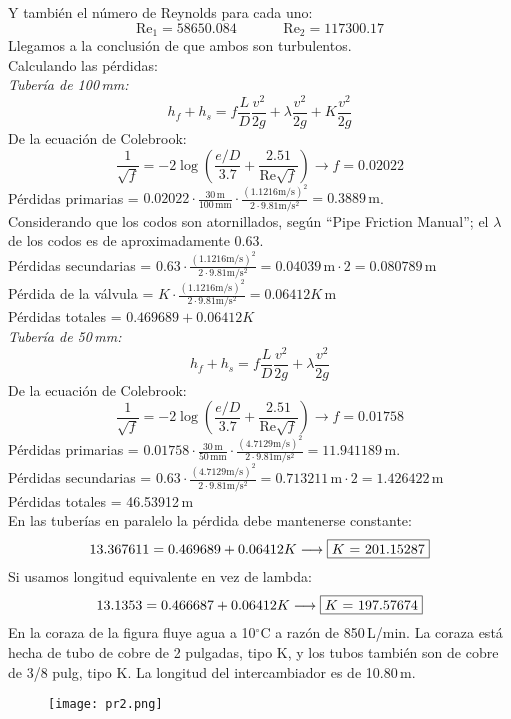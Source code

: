 \documentclass[a4paper,12pt]{exam}
\begin{document}
\begin{questions}
$$$$
Y también el número de Reynolds para cada uno:
$$
\mathrm{Re_{1}} = 58650.084 \hspace{40pt} \mathrm{Re_{2}} = 117300.17
$$
Llegamos a la conclusión de que ambos son turbulentos.\\
Calculando las pérdidas:\\
\textit{Tubería de 100\,mm:}\\
$$
h_{f}+h_{s} = f\frac{L}{D} \frac{v^{2}}{2g} + \lambda \frac{v^{2}}{2g} + K\frac{v^{2}}{2g}
$$
De la ecuación de Colebrook:
$$
\frac{1}{\sqrt{f}} = -2\log \left(\frac{e/D}{3.7} + \frac{2.51}{\mathrm{Re}\sqrt{f}}\right) \longrightarrow f = 0.02022
$$
Pérdidas primarias = $0.02022\cdot\frac{30\,\mathrm{m}}{100\,\mathrm{mm}}\cdot \frac{(1.1216\mathrm{m/s})^{2}}{2\cdot 9.81\mathrm{m/s^{2}}} = 0.3889\,\mathrm{m}$.\\
Considerando que los codos son atornillados, según ``Pipe Friction Manual''; el $\lambda$ de los codos es de aproximadamente 0.63.\\[4pt]
Pérdidas secundarias = $0.63\cdot \frac{(1.1216\mathrm{m/s})^{2}}{2\cdot 9.81\mathrm{m/s^{2}}} = 0.04039\,\mathrm{m} \cdot 2 = 0.080789\,\mathrm{m}$\\[4pt]
Pérdida de la válvula = $K\cdot \frac{(1.1216\mathrm{m/s})^{2}}{2\cdot 9.81\mathrm{m/s^{2}}} = 0.06412 K\,\mathrm{m}$\\[4pt]
Pérdidas totales = $0.469689 + 0.06412K$\\[5pt]
\textit{Tubería de 50\,mm:}\\
$$
h_{f}+h_{s} = f\frac{L}{D} \frac{v^{2}}{2g} + \lambda \frac{v^{2}}{2g}
$$
De la ecuación de Colebrook:
$$
\frac{1}{\sqrt{f}} = -2\log \left(\frac{e/D}{3.7} + \frac{2.51}{\mathrm{Re}\sqrt{f}}\right) \longrightarrow f = 0.01758
$$
Pérdidas primarias = $0.01758\cdot\frac{30\,\mathrm{m}}{50\,\mathrm{mm}}\cdot \frac{(4.7129\mathrm{m/s})^{2}}{2\cdot 9.81\mathrm{m/s^{2}}} = 11.941189\,\mathrm{m}$.\\[4pt]
Pérdidas secundarias = $0.63\cdot \frac{(4.7129\mathrm{m/s})^{2}}{2\cdot 9.81\mathrm{m/s^{2}}} = 0.713211\,\mathrm{m} \cdot 2 = 1.426422\,\mathrm{m}$\\[4pt]
Pérdidas totales = 46.53912\,m\\[5pt]
En las tuberías en paralelo la pérdida debe mantenerse constante:
$$
13.367611 = 0.469689 + 0.06412K \longrightarrow \fbox{$K$ = 201.15287}
$$
Si usamos longitud equivalente en vez de lambda: \\
$$
13.1353 = 0.466687+0.06412K \longrightarrow \fbox{$K$ = 197.57674}
$$
\newpage
\question[4] En la coraza de la figura fluye agua a 10$^{\circ}$C a razón de 850\,L/min. La coraza está hecha de tubo de cobre de 2 pulgadas, tipo K, y los tubos también son de cobre de 3/8 pulg, tipo K. La longitud del intercambiador es de 10.80\,m.
\begin{figure}[H]
\centering
\texttt{[image: pr2.png]}
\end{figure}
\begin{parts}

\end{parts}
\end{questions}
\end{document}
